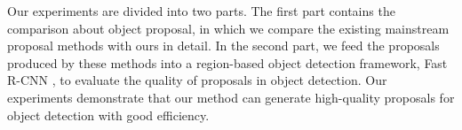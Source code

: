 \documentclass[10pt,twocolumn,letterpaper]{article}
\begin{document}
Our experiments are divided into two parts.
The first part contains the comparison about object proposal, in which we
compare the existing mainstream proposal methods with ours in detail.
In the second part, we feed the proposals produced by these methods into a
region-based object detection framework, Fast R-CNN \cite{girshick2015fast},
to evaluate the quality of proposals in object detection.
Our experiments demonstrate that our method can generate high-quality
proposals for object detection with good efficiency.


\begin{figure}[!htbp]
  \centering
  \hspace{.05\linewidth}
  \\ \vspace{-0.1in}
  \hspace{.05\linewidth}

\end{figure}
\end{document}
